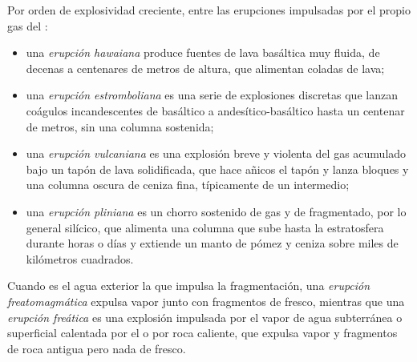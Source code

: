 \begin{definition}\label{def:b2:eruptive-styles:styles}
Por orden de explosividad creciente, entre las erupciones impulsadas por el propio gas del :
\begin{itemize}
\item una \emph{erupción hawaiana} produce fuentes de
lava basáltica muy fluida, de decenas a centenares de metros de altura, que alimentan coladas de lava;
\item una \emph{erupción estromboliana} es una serie de
explosiones discretas que lanzan coágulos incandescentes de  basáltico a
andesítico-basáltico hasta un centenar de metros, sin una columna
sostenida;
\item una \emph{erupción vulcaniana} es una explosión breve y violenta
del gas acumulado bajo un tapón de lava solidificada, que hace añicos
el tapón y lanza bloques y una columna oscura de ceniza fina, típicamente de un 
intermedio;
\item una \emph{erupción pliniana} es un chorro sostenido de gas
y de  fragmentado, por lo general silícico, que alimenta una columna que sube hasta la
estratosfera durante horas o días y extiende un manto de pómez y ceniza sobre
miles de kilómetros cuadrados.
\end{itemize}
Cuando es el agua exterior la que impulsa la fragmentación, una \emph{erupción
freatomagmática} expulsa vapor junto con fragmentos
de  fresco, mientras que una \emph{erupción freática} es una
explosión impulsada por el vapor de agua subterránea o superficial calentada por el  o por roca caliente,
que expulsa vapor y fragmentos de roca antigua pero nada de  fresco.
\end{definition}

